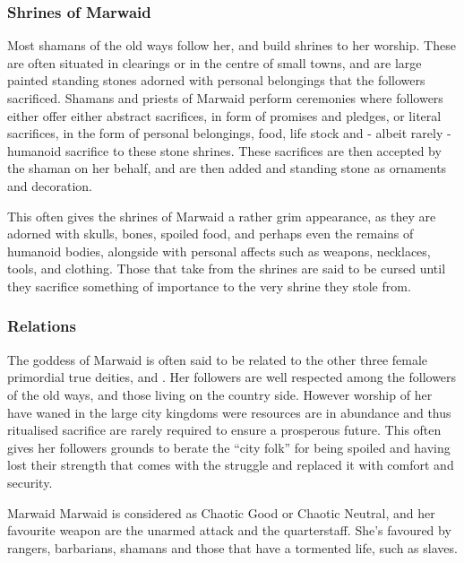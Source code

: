 \subsubsection{Shrines of Marwaid}

Most shamans of the old ways follow her, and build shrines to her worship.
These are often situated in clearings or in the centre of small towns, and are
large painted standing stones adorned with personal belongings that the
followers sacrificed. Shamans and priests of Marwaid perform ceremonies where
followers either offer either abstract sacrifices, in form of promises and
pledges, or literal sacrifices, in the form of personal belongings, food, life
stock and - albeit rarely - humanoid sacrifice to these stone shrines. These
sacrifices are then accepted by the shaman on her behalf, and are then added
and standing stone as ornaments and decoration.

This often gives the shrines of Marwaid a rather grim appearance, as they are
adorned with skulls, bones, spoiled food, and perhaps even the remains of
humanoid bodies, alongside with personal affects such as weapons, necklaces,
tools, and clothing. Those that take from the shrines are said to be cursed
until they sacrifice something of importance to the very shrine they stole
from.

\subsubsection{Relations}

The goddess of Marwaid is often said to be related to the other three
female primordial true deities,  and .
Her followers are well respected among the followers of the old ways, and
those living on the country side. However worship of her have waned in the
large city kingdoms were resources are in abundance and thus ritualised
sacrifice are rarely required to ensure a prosperous future. This often gives
her followers grounds to berate the ``city folk'' for being spoiled and having
lost their strength that comes with the struggle and replaced it with comfort
and security.

\begin{35e}{Marwaid}
  Marwaid is considered as Chaotic Good or Chaotic Neutral, and her favourite
  weapon are the unarmed attack and the quarterstaff. She's favoured by rangers,
  barbarians, shamans and those that have a tormented life, such as slaves.
\end{35e}

\ifimages
\clearpage
{}
\clearpage
\fi
